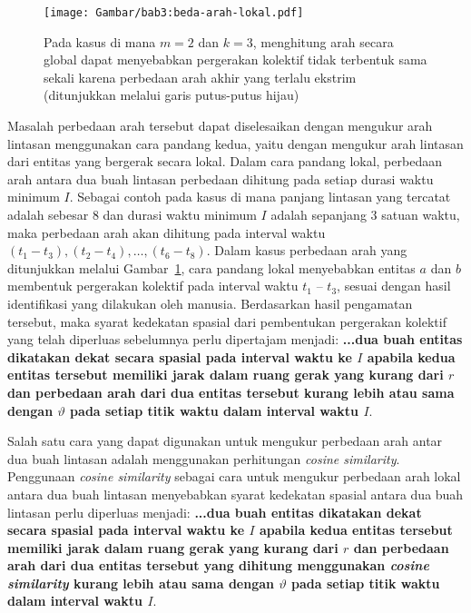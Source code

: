 \begin{figure}[t]
    \centering
    \captionsetup{width=0.8\textwidth}
    \texttt{[image: Gambar/bab3:beda-arah-lokal.pdf]}
    \caption[Masalah identifikasi pada penghitungan arah secara global]{Pada kasus di mana $m = 2$ dan $k = 3$, menghitung arah secara global dapat menyebabkan pergerakan kolektif tidak terbentuk sama sekali karena perbedaan arah akhir yang terlalu ekstrim (ditunjukkan melalui garis putus-putus hijau)}
    \label{bab3:beda-arah-lokal}
\end{figure}

Masalah perbedaan arah tersebut dapat diselesaikan dengan mengukur arah lintasan menggunakan cara pandang kedua, yaitu dengan mengukur arah lintasan dari entitas yang bergerak secara lokal. Dalam cara pandang lokal, perbedaan arah antara dua buah lintasan perbedaan dihitung pada setiap durasi waktu minimum $I$. Sebagai contoh pada kasus di mana panjang lintasan yang tercatat adalah sebesar $8$ dan durasi waktu minimum $I$ adalah sepanjang $3$ satuan waktu, maka perbedaan arah akan dihitung pada interval waktu $(t_1 - t_3), (t_2 - t_4), \ldots, (t_6 - t_8)$. Dalam kasus perbedaan arah yang ditunjukkan melalui Gambar~\ref{bab3:beda-arah-lokal}, cara pandang lokal menyebabkan entitas $a$ dan $b$ membentuk pergerakan kolektif pada interval waktu $t_1$ -- $t_3$, sesuai dengan hasil identifikasi yang dilakukan oleh manusia. Berdasarkan hasil pengamatan tersebut, maka syarat kedekatan spasial dari pembentukan pergerakan kolektif yang telah diperluas sebelumnya perlu dipertajam menjadi: \textbf{...dua buah entitas dikatakan dekat secara spasial pada interval waktu ke $I$ apabila kedua entitas tersebut memiliki jarak dalam ruang gerak yang kurang dari $r$ dan perbedaan arah dari dua entitas tersebut kurang lebih atau sama dengan $\vartheta$ pada setiap titik waktu dalam interval waktu $I$}.

Salah satu cara yang dapat digunakan untuk mengukur perbedaan arah antar dua buah lintasan adalah menggunakan perhitungan \textit{cosine similarity}. Penggunaan \textit{cosine similarity} sebagai cara untuk mengukur perbedaan arah lokal antara dua buah lintasan menyebabkan syarat kedekatan spasial antara dua buah lintasan perlu diperluas menjadi: \textbf{...dua buah entitas dikatakan dekat secara spasial pada interval waktu ke $I$ apabila kedua entitas tersebut memiliki jarak dalam ruang gerak yang kurang dari $r$ dan perbedaan arah dari dua entitas tersebut yang dihitung menggunakan \textit{cosine similarity} kurang lebih atau sama dengan $\vartheta$ pada setiap titik waktu dalam interval waktu $I$}.
    
